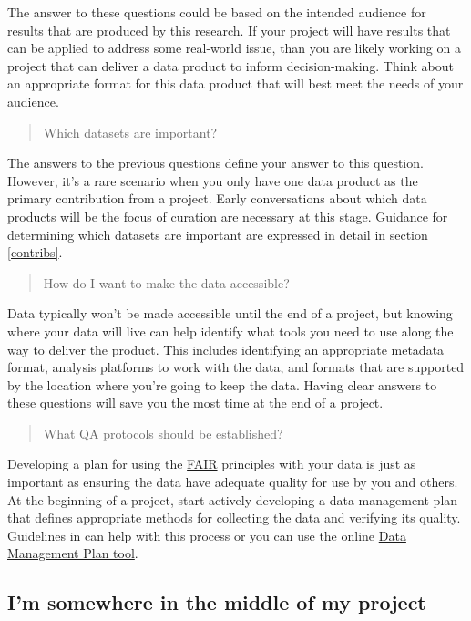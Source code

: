 \documentclass[
]{book}
\begin{document}
The answer to these questions could be based on the intended audience for results that are produced by this research. If your project will have results that can be applied to address some real-world issue, than you are likely working on a project that can deliver a data product to inform decision-making. Think about an appropriate format for this data product that will best meet the needs of your audience.

\begin{quote}
Which datasets are important?
\end{quote}

The answers to the previous questions define your answer to this question. However, it's a rare scenario when you only have one data product as the primary contribution from a project. Early conversations about which data products will be the focus of curation are necessary at this stage. Guidance for determining which datasets are important are expressed in detail in section \ref{contribs}.

\begin{quote}
How do I want to make the data accessible?
\end{quote}

Data typically won't be made accessible until the end of a project, but knowing where your data will live can help identify what tools you need to use along the way to deliver the product. This includes identifying an appropriate metadata format, analysis platforms to work with the data, and formats that are supported by the location where you're going to keep the data. Having clear answers to these questions will save you the most time at the end of a project.

\begin{quote}
What QA protocols should be established?
\end{quote}

Developing a plan for using the \protect\hyperlink{fair}{FAIR} principles with your data is just as important as ensuring the data have adequate quality for use by you and others. At the beginning of a project, start actively developing a data management plan that defines appropriate methods for collecting the data and verifying its quality. Guidelines in \citet{Michener15} can help with this process or you can use the online \href{https://dmptool.org/}{Data Management Plan tool}.

\hypertarget{middleproject}{%
\subsection{I'm somewhere in the middle of my project}\label{middleproject}}
\end{document}
